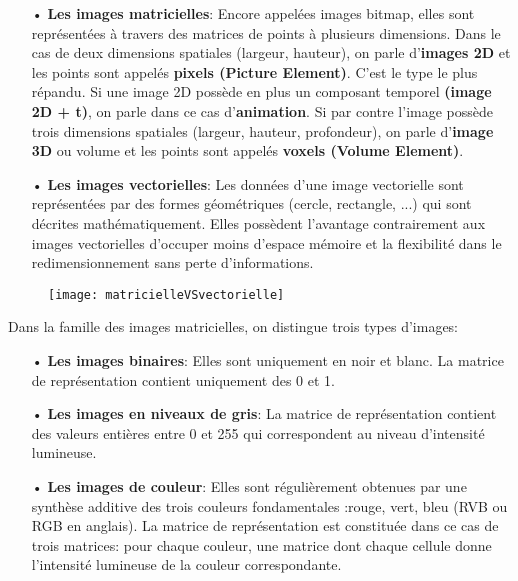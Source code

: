     \begin{itemize}
        \item[•]\textbf{Les images matricielles}: Encore appelées images bitmap, elles sont représentées à travers des matrices de points à plusieurs dimensions. Dans le cas de deux dimensions spatiales (largeur, hauteur), on parle d’\textbf{images 2D} et les points sont appelés \textbf{pixels (Picture Element)}. C’est le type le plus répandu. Si une image 2D possède en plus un composant temporel \textbf{(image 2D + t)}, on parle dans ce cas d’\textbf{animation}. Si par contre l’image possède trois dimensions spatiales (largeur, hauteur, profondeur), on parle d’\textbf{image 3D} ou volume et les points sont appelés \textbf{voxels (Volume Element)}.
        \item[•]\textbf{Les images vectorielles}: Les données d'une image vectorielle sont représentées par des formes géométriques (cercle, rectangle, ...) qui sont décrites mathématiquement. Elles possèdent l’avantage contrairement aux images vectorielles d’occuper moins d’espace mémoire et la flexibilité dans le redimensionnement sans perte d’informations.
    \end{itemize}
    \begin{figure}
        \centering
        \texttt{[image: matricielleVSvectorielle]}
    \end{figure}
    Dans la famille des images matricielles, on distingue trois types d’images:
    \begin{itemize}
        \item[•]\textbf{Les images binaires}: Elles sont uniquement en noir et blanc. La matrice de représentation contient uniquement des 0 et 1.
        \item[•]\textbf{Les images en niveaux de gris}: La matrice de représentation contient des valeurs entières entre 0 et 255 qui correspondent au niveau d’intensité lumineuse.
        \item[•]\textbf{Les images de couleur}: Elles sont régulièrement obtenues par une synthèse additive des trois couleurs fondamentales :rouge, vert, bleu (RVB ou RGB en anglais). La matrice de représentation est constituée dans ce cas de trois matrices: pour chaque couleur, une matrice dont chaque cellule donne l’intensité lumineuse de la couleur correspondante.
    \end{itemize}
